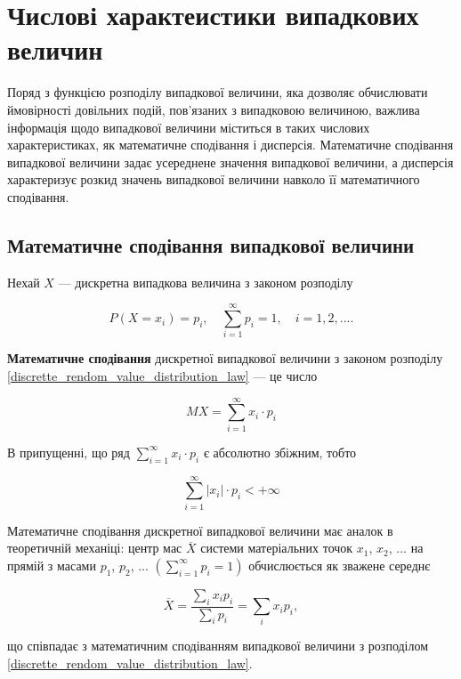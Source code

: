 \section{Числові характеистики випадкових величин}

Поряд з функцією розподілу випадкової величини, яка
дозволяє обчислювати ймовірності довільних подій,
пов'язаних з випадковою величиною, важлива інформація
щодо випадкової величини міститься в таких числових
характеристиках, як математичне сподівання і дисперсія.
Математичне сподівання випадкової величини задає усереднене
значення випадкової величини, а дисперсія характеризує розкид
значень випадкової величини навколо її математичного сподівання.

\subsection{Математичне сподівання випадкової величини}

Нехай $X$ --- дискретна випадкова величина з законом розподілу

\begin{equation}
    \label{discrette_rendom_value_distribution_law}
    P(X = x_i) = p_i,
    \quad \sum\limits_{i=1}^{\infty} p_i = 1,
    \quad i = 1, 2, ....
\end{equation}

\begin{definition}
    \textbf{Математичне сподівання} дискретної випадкової величини з законом
    розподілу \ref{discrette_rendom_value_distribution_law} --- це число 
    
    \begin{equation}
        MX = \sum\limits_{i=1}^{\infty} x_i \cdot p_i
    \end{equation}

    В припущенні, що ряд $\sum\limits_{i=1}^{\infty} x_i \cdot p_i$
    є абсолютно збіжним, тобто

    \begin{equation}
        \sum\limits_{i=1}^{\infty} |x_i| \cdot p_i < +\infty
    \end{equation}
\end{definition}

\begin{remark}
    Математичне сподівання дискретної випадкової величини
    має аналок в теоретичній механіці: центр мас $\overline{X}$ системи матеріальних
    точок $x_1$, $x_2$, ... на прямій з масами $p_1$, $p_2$, ...
    $(\sum\limits_{i=1}^{\infty} p_i = 1)$ обчислюється
    як зважене середнє
    
    $$\overline{X}
    = \frac{\sum\limits_{i} x_i p_i}{\sum\limits_{i} p_i}
    = \sum\limits_{i} x_i p_i,$$
    
    що співпадає з математичним сподіванням випадкової величини з 
    розподілом \ref{discrette_rendom_value_distribution_law}.

    \beautifulImage
\end{remark}

